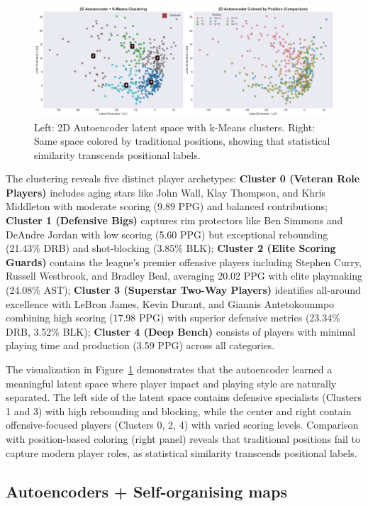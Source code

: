 \documentclass{article}
\begin{document}
\begin{figure}[h]
    \centering
    \includegraphics[width=\linewidth]{media/2a.png}
    \caption{Left: 2D Autoencoder latent space with k-Means clusters. Right: Same space colored by traditional positions, showing that statistical similarity transcends positional labels.}
    \label{fig:ae_clustering}
\end{figure}

The clustering reveals five distinct player archetypes: {\bf Cluster 0 (Veteran Role Players)} includes aging stars like John Wall, Klay Thompson, and Khris Middleton with moderate scoring (9.89 PPG) and balanced contributions; {\bf Cluster 1 (Defensive Bigs)} captures rim protectors like Ben Simmons and DeAndre Jordan with low scoring (5.60 PPG) but exceptional rebounding (21.43\% DRB) and shot-blocking (3.85\% BLK); {\bf Cluster 2 (Elite Scoring Guards)} contains the league's premier offensive players including Stephen Curry, Russell Westbrook, and Bradley Beal, averaging 20.02 PPG with elite playmaking (24.08\% AST); {\bf Cluster 3 (Superstar Two-Way Players)} identifies all-around excellence with LeBron James, Kevin Durant, and Giannis Antetokounmpo combining high scoring (17.98 PPG) with superior defensive metrics (23.34\% DRB, 3.52\% BLK); {\bf Cluster 4 (Deep Bench)} consists of players with minimal playing time and production (3.59 PPG) across all categories.

The visualization in Figure~\ref{fig:ae_clustering} demonstrates that the autoencoder learned a meaningful latent space where player impact and playing style are naturally separated. The left side of the latent space contains defensive specialists (Clusters 1 and 3) with high rebounding and blocking, while the center and right contain offensive-focused players (Clusters 0, 2, 4) with varied scoring levels. Comparison with position-based coloring (right panel) reveals that traditional positions fail to capture modern player roles, as statistical similarity transcends positional labels.

\subsection{Autoencoders + Self-organising maps}
\end{document}
